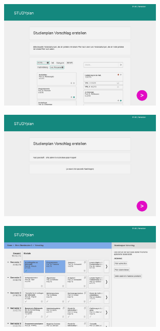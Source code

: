 \begin{figure}[!htb]
	\caption{}
	\label{fig:gui-generierung-2}
	\centering
	\includegraphics[width=0.7\textwidth]{../GUI/ergebnisse/generierung-2.png}
\end{figure}

\begin{figure}[!htb]
	\caption{}
	\label{fig:gui-generierung-3}
	\centering
	\includegraphics[width=0.7\textwidth]{../GUI/ergebnisse/generierung-3.png}
\end{figure}

\begin{figure}[!htb]
	\caption{}
	\label{fig:gui-generierung-4}
	\centering
	\includegraphics[width=0.7\textwidth]{../GUI/ergebnisse/generierung-4.png}
\end{figure}


